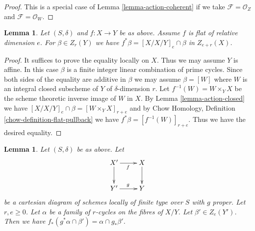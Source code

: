 \documentclass{stacks-project}
\theoremstyle{plain}
\newtheorem{lemma}[subsection]{Lemma}
\theoremstyle{definition}
\theoremstyle{remark}
\numberwithin{equation}{subsection}
\begin{document}
\begin{proof}
This is a special case of Lemma \ref{lemma-action-coherent}
if we take $\mathcal{F} = \mathcal{O}_Z$ and $\mathcal{F} = \mathcal{O}_W$.
\end{proof}

\begin{lemma}
\label{lemma-flat-pullback-as-action}
Let $(S, \delta)$ and $f : X \to Y$ be as above. Assume
$f$ is flat of relative dimension $e$. For $\beta \in Z_r(Y)$
we have $f^*\beta = [X/X/Y]_e \cap \beta$ in $Z_{e + r}(X)$.
\end{lemma}

\begin{proof}
It suffices to prove the equality locally on $X$. Thus we may assume
$Y$ is affine. In this case $\beta$ is a finite integer linear combination
of prime cycles. Since both sides of the equality are additive in $\beta$
we may assume $\beta = [W]$ where $W$ is an integral closed subscheme of
$Y$ of $\delta$-dimension $r$. Let $f^{-1}(W) = W \times_Y X$ be the
scheme theoretic inverse image of $W$ in $X$. By
Lemma \ref{lemma-action-closed} we have
$[X/X/Y]_e \cap \beta = [W \times_Y X]_{r + e}$ and by
Chow Homology, Definition \ref{chow-definition-flat-pullback}
we have $f^*\beta = [f^{-1}(W)]_{r + e}$. Thus we have the desired
equality.
\end{proof}

\begin{lemma}
\label{lemma-action-push-pull}
Let $(S, \delta)$ be as above. Let
$$
\xymatrix{
X' \ar[r]_f \ar[d] & X \ar[d] \\
Y' \ar[r]^g & Y
}
$$
be a cartesian diagram of schemes locally of finite type over $S$
with $g$ proper. Let $r, e \geq 0$. Let $\alpha$ be a family of
$r$-cycles on the fibres of $X/Y$. Let $\beta' \in Z_e(Y')$.
Then we have $f_*(g^*\alpha \cap \beta') = \alpha \cap g_*\beta'$.
\end{lemma}
\end{document}

